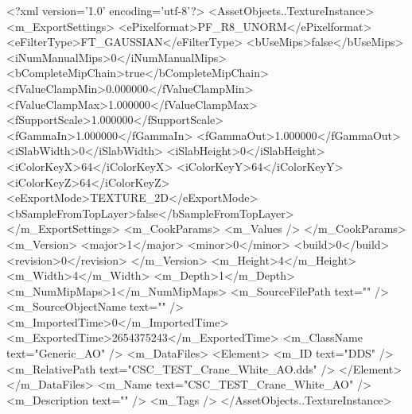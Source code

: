 <?xml version='1.0' encoding='utf-8'?>
<AssetObjects..TextureInstance>
  <m_ExportSettings>
    <ePixelformat>PF_R8_UNORM</ePixelformat>
    <eFilterType>FT_GAUSSIAN</eFilterType>
    <bUseMips>false</bUseMips>
    <iNumManualMips>0</iNumManualMips>
    <bCompleteMipChain>true</bCompleteMipChain>
    <fValueClampMin>0.000000</fValueClampMin>
    <fValueClampMax>1.000000</fValueClampMax>
    <fSupportScale>1.000000</fSupportScale>
    <fGammaIn>1.000000</fGammaIn>
    <fGammaOut>1.000000</fGammaOut>
    <iSlabWidth>0</iSlabWidth>
    <iSlabHeight>0</iSlabHeight>
    <iColorKeyX>64</iColorKeyX>
    <iColorKeyY>64</iColorKeyY>
    <iColorKeyZ>64</iColorKeyZ>
    <eExportMode>TEXTURE_2D</eExportMode>
    <bSampleFromTopLayer>false</bSampleFromTopLayer>
  </m_ExportSettings>
  <m_CookParams>
    <m_Values />
  </m_CookParams>
  <m_Version>
    <major>1</major>
    <minor>0</minor>
    <build>0</build>
    <revision>0</revision>
  </m_Version>
  <m_Height>4</m_Height>
  <m_Width>4</m_Width>
  <m_Depth>1</m_Depth>
  <m_NumMipMaps>1</m_NumMipMaps>
  <m_SourceFilePath text="" />
  <m_SourceObjectName text="" />
  <m_ImportedTime>0</m_ImportedTime>
  <m_ExportedTime>2654375243</m_ExportedTime>
  <m_ClassName text="Generic_AO" />
  <m_DataFiles>
    <Element>
      <m_ID text="DDS" />
      <m_RelativePath text="CSC_TEST_Crane_White_AO.dds" />
    </Element>
  </m_DataFiles>
  <m_Name text="CSC_TEST_Crane_White_AO" />
  <m_Description text="" />
  <m_Tags />
</AssetObjects..TextureInstance>